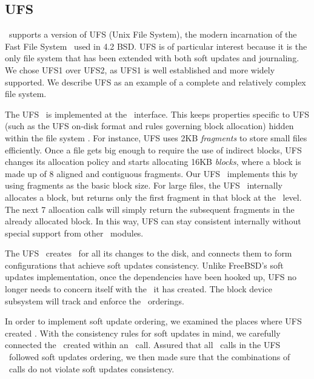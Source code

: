 \subsection{UFS}
\label{sec:modules:ufs}

\Kudos\ supports a version of UFS (Unix File System), the modern incarnation of
the Fast File System~\cite{mckusick84fast} used in 4.2 BSD. UFS is of
particular interest because it is the only file system that has been extended
with both soft updates and journaling.~\cite{seltzer00journaling} We chose UFS1
over UFS2, as UFS1 is well established and more widely supported. We describe
UFS as an example of a complete and relatively complex file system.

The UFS \module\ is implemented at the \LFS\ interface. This keeps properties
specific to UFS (such as the UFS on-disk format and rules governing block
allocation) hidden within the file system \module. For instance, UFS uses 2KB
\emph{fragments} to store small files efficiently. Once a file gets big enough
to require the use of indirect blocks, UFS changes its allocation policy and
starts allocating 16KB \emph{blocks}, where a block is made up of 8 aligned and
contiguous fragments. Our UFS \module\ implements this by using fragments as
the basic block size. For large files, the UFS \module\ internally allocates a
block, but returns only the first fragment in that block at the \LFS\ level.
The next 7 allocation calls will simply return the subsequent fragments in the
already allocated block. In this way, UFS can stay consistent internally
without special support from other \Kudos\ modules.

The UFS \module\ creates \chdescs\ for all its changes to the disk, and
connects them to form configurations that achieve soft updates consistency.
Unlike FreeBSD's soft updates implementation, once the dependencies have been
hooked up, UFS no longer needs to concern itself with the \chdescs\ it has
created. The block device subsystem will track and enforce the \chdesc\
orderings.

In order to implement soft update ordering, we examined the places where UFS
created \chdescs. With the consistency rules for soft updates in mind, we
carefully connected the \chdescs\ created within an \LFS\ call. Assured that
all \LFS\ calls in the UFS \module\ followed soft updates ordering, we then
made sure that the combinations of \LFS\ calls do not violate soft updates
consistency.\todo{Which is to say, we trusted UHFS...}

